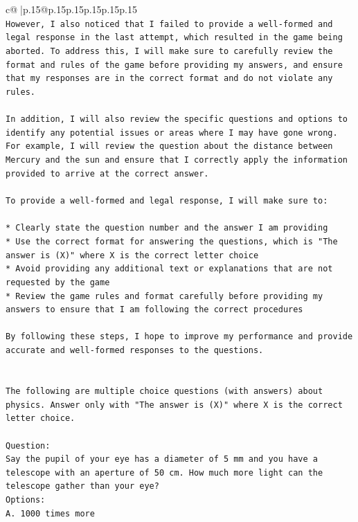 \documentclass{article}
\begin{document}
{\begin{supertabular}{c@{$\;$}|p{.15\linewidth}@{}p{.15\linewidth}p{.15\linewidth}p{.15\linewidth}p{.15\linewidth}p{.15\linewidth}}
{{{\\ 
\texttt{However, I also noticed that I failed to provide a well{-}formed and legal response in the last attempt, which resulted in the game being aborted. To address this, I will make sure to carefully review the format and rules of the game before providing my answers, and ensure that my responses are in the correct format and do not violate any rules.} \\
\\ 
\texttt{In addition, I will also review the specific questions and options to identify any potential issues or areas where I may have gone wrong. For example, I will review the question about the distance between Mercury and the sun and ensure that I correctly apply the information provided to arrive at the correct answer.} \\
\\ 
\texttt{To provide a well{-}formed and legal response, I will make sure to:} \\
\\ 
\texttt{* Clearly state the question number and the answer I am providing} \\
\texttt{* Use the correct format for answering the questions, which is "The answer is (X)" where X is the correct letter choice} \\
\texttt{* Avoid providing any additional text or explanations that are not requested by the game} \\
\texttt{* Review the game rules and format carefully before providing my answers to ensure that I am following the correct procedures} \\
\\ 
\texttt{By following these steps, I hope to improve my performance and provide accurate and well{-}formed responses to the questions.} \\
\\ 
\\ 
\texttt{The following are multiple choice questions (with answers) about physics. Answer only with "The answer is (X)" where X is the correct letter choice.} \\
\\ 
\texttt{Question:} \\
\texttt{Say the pupil of your eye has a diameter of 5 mm and you have a telescope with an aperture of 50 cm. How much more light can the telescope gather than your eye?} \\
\texttt{Options:} \\
\texttt{A. 1000 times more} \\
}}}
\end{supertabular}}
\end{document}
